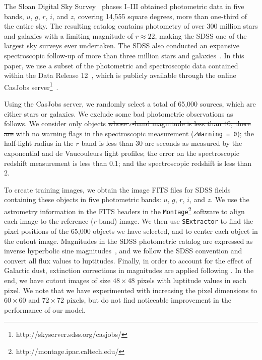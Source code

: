 \documentclass[fleqn,usenatbib]{mnras}
\begin{document}
The Sloan Digital Sky Survey~\citep[SDSS;][]{york2000sloan}
phases I--III obtained photometric data in five bands,
$u$, $g$, $r$, $i$, and $z$,
covering 14,555 square degrees, more than one-third of the entire sky.
The resulting catalog contains photometry of over 300 million stars and galaxies
with a limiting magnitude of $r \approx 22$,
making the SDSS one of the largest sky surveys ever undertaken.
The SDSS also conducted an expansive spectroscopic follow-up of
more than three million stars and galaxies~\citep{eisenstein2011sdss}.
In this paper, we use a subset of the photometric and spectroscopic data
contained within the Data Release 12~\citep[DR12;][]{alam2015eleventh},
which is publicly available through the online CasJobs
server\footnote{http://skyserver.sdss.org/casjobs/}~\citep{li2008casjobs}.

Using the CasJobs server, we randomly select a total of 65,000 sources, which are either stars or galaxies.
We exclude some bad photometric observations as follows.
We consider only objects
\sout{ whose $r$-band magnitude is less than 40; there are }
with no warning flags in the spectroscopic measurement (\texttt{zWarning = 0});
the half-light radius in the $r$ band is less than 30 arc seconds
as measured by the exponential and de Vaucouleurs light profiles;
the error on the spectroscopic redshift measurement is less than 0.1; and
the spectroscopic redshift is less than 2.

To create training images,
we obtain the image FITS files for SDSS fields containing these objects
in five photometric bands: $u$, $g$, $r$, $i$, and $z$.
We use the astrometry information in the FITS headers
in the \texttt{Montage}\footnote{http://montage.ipac.caltech.edu/} software
to align each image to the reference ($r$-band) image.
We then use \texttt{SExtractor} to find the pixel positions of
the 65,000 objects we have selected,
and to center each object in the cutout image.
{
Magnitudes in the SDSS photometric catalog are expressed as inverse hyperbolic
sine magnitudes~\citep[also known as luptitudes;][]{lupton1999modified},
and we follow the SDSS convention and convert all flux values to luptitudes.
}
Finally, in order to account for the effect of Galactic dust,
extinction corrections in magnitudes are applied
following \cite{schlegel1998maps}.
In the end, we have cutout images of size $48\times48$ pixels
with luptitude values in each pixel.
We note that we have experimented with increasing the pixel dimensions to
$60\times60$ and $72\times72$ pixels, but do not find noticeable
improvement in the performance of our model.
\end{document}
